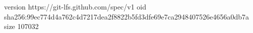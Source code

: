 version https://git-lfs.github.com/spec/v1
oid sha256:99ec774d4a762c4d7217dea2f8822b5fd3dfe69e7ca2948407526e4656a0db7a
size 107032
